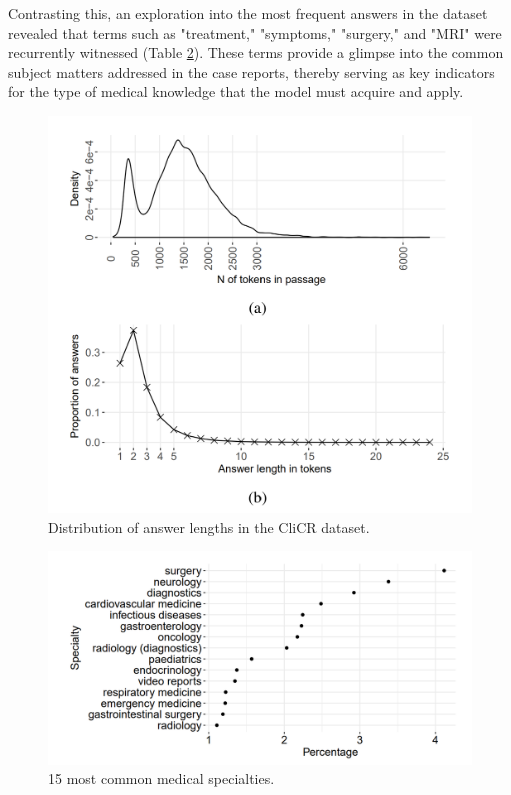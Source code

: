 \documentclass[onecolumn, conference]{IEEEtran}
\begin{document}
Contrasting this, an exploration into the most frequent answers in the dataset revealed that terms such as "treatment," "symptoms," "surgery," and "MRI" were recurrently witnessed (Table \ref{fig:answer_type_stats}). These terms provide a glimpse into the common subject matters addressed in the case reports, thereby serving as key indicators for the type of medical knowledge that the model must acquire and apply.

\begin{figure}
  \centering
  \includegraphics[width=\linewidth]{1.png}
  \caption{Distribution of answer lengths in the CliCR dataset. \cite{Suster2018}}
  \label{fig:passage_length}
\end{figure}

\begin{figure}
  \centering
  \includegraphics[width=\linewidth]{2.png}
  \caption{15 most common medical specialties. \cite{Suster2018}}
  \label{fig:answer_type_stats}
\end{figure}
\end{document}
